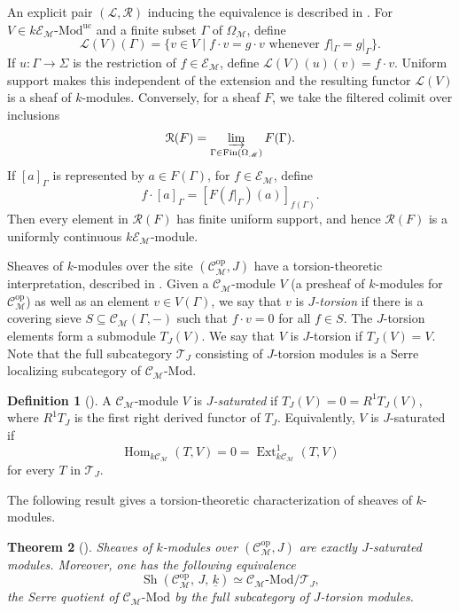 \documentclass[10pt, reqno]{amsart}
\theoremstyle{plain}
\newtheorem{theorem}{Theorem}[section]
\numberwithin{equation}{section}
\theoremstyle{definition}
\newtheorem{definition}[theorem]{Definition}
\newcommand{\Hom}{\operatorname{Hom}}
\newcommand{\Ext}{\operatorname{Ext}}
\newcommand{\Sh}{\operatorname{Sh}}
\newcommand{\Mod}{{\textrm{-}\mathrm{Mod}}}
\newcommand{\Fin}{\operatorname{Fin}}
\newcommand{\op}{\mathrm{op}}
\newcommand{\M}{\mathscr M}
\newcommand{\E}{\mathscr E}
\newcommand{\C}{\mathscr C}
\newcommand{\T}{\mathcal T}
\begin{document}
An explicit pair $(\mathcal{L}, \mathcal{R})$ inducing the equivalence is described in \cite{LiRel}. For $V \in k\E_{\M} \Mod^{\mathrm{uc}}$ and a finite subset $\Gamma$ of $\Omega_\M$, define
\[
\mathcal L(V)(\Gamma) = \{v \in V \mid f \cdot v = g \cdot v \text{ whenever }f|_\Gamma = g|_\Gamma\}.
\]
If $u: \Gamma \to \Sigma$ is the restriction of $f \in \E_\M$, define $\mathcal L(V)(u)(v) = f \cdot v$. Uniform support makes this independent of the extension and the resulting functor $\mathcal{L}(V)$ is a sheaf of $k$-modules. Conversely, for a sheaf $F$, we take the filtered colimit over inclusions
\[
\mathcal R(F) = \varinjlim_{\Gamma \in \Fin(\Omega_\M)} F(\Gamma).
\]
If $[a]_\Gamma$ is represented by $a \in F(\Gamma)$, for $f \in \E_\M$, define
\[
f \cdot [a]_\Gamma = [F(f|_\Gamma)(a)]_{f(\Gamma)}.
\]
Then every element in $\mathcal R(F)$ has finite uniform support, and hence $\mathcal R(F)$ is a uniformly continuous $k\E_\M$-module.

Sheaves of $k$-modules over the site $(\C_\M^{\op}, J)$ have a torsion-theoretic interpretation, described in \cite{DLL}. Given a $\C_\M$-module $V$ (a presheaf of $k$-modules for $\C_\M^{\op}$) as well as an element $v \in V(\Gamma)$, we say that $v$ is \emph{$J$-torsion} if there is a covering sieve $S \subseteq \C_\M(\Gamma, -)$ such that $f \cdot v = 0$ for all $f \in S$. The $J$-torsion elements form a submodule $T_J(V)$. We say that $V$ is $J$-torsion if $T_J(V) = V$. Note that the full subcategory $\mathcal{T}_J$ consisting of $J$-torsion modules is a Serre localizing subcategory of $\C_\M \Mod$.

\begin{definition}[\cite{DLL}]
A $\C_\M$-module $V$ is \emph{$J$-saturated} if $T_J(V) = 0 = R^1T_J(V)$, where $R^1T_J$ is the first right derived functor of $T_J$. Equivalently, $V$ is $J$-saturated if
\[
\Hom_{k\C_\M}(T,V) = 0 = \Ext^1_{k\C_\M}(T,V)
\]
for every $T$ in $\mathcal{T}_J$.
\end{definition}

The following result gives a torsion-theoretic characterization of sheaves of $k$-modules.

\begin{theorem}[\cite{DLL}]\label{thm:torsion-sheaf}
Sheaves of $k$-modules over $(\C_\M^{\op}, J)$ are exactly $J$-saturated modules. Moreover, one has the following equivalence
\[
\Sh(\C^{\op}_{\M}, \,J, \, \underline{k}) \simeq \C_\M \Mod/\T_J,
\]
the Serre quotient of $\C_\M \Mod$ by the full subcategory of $J$-torsion modules.
\end{theorem}
\end{document}
